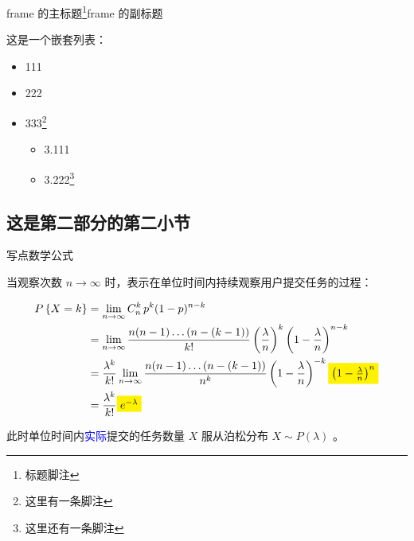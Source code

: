 \documentclass[aspectratio=169]{beamer}
\begin{document}
\begin{frame}{frame 的主标题\footnote{标题脚注}}{frame 的副标题}

    这是一个嵌套列表：

    \begin{itemize}
        \item 111
        \item 222
        \item 333\footnote{这里有一条脚注}
              \begin{itemize}
                  \item 3.111
                  \item 3.222\footnote{这里还有一条脚注}
              \end{itemize}
    \end{itemize}

\end{frame}

\subsection{这是第二部分的第二小节}

\begin{frame}{写点数学公式}

    当观察次数 $n \rightarrow \infty$ 时，表示在单位时间内持续观察用户提交任务的过程：

    \begin{equation*}
        \begin{split}
            P\left\{X=k\right\} & = \lim_{n \rightarrow \infty} C_n^k \, p^k (1-p)^{n-k}                                                                                                                              \\
            & = \lim_{n \rightarrow \infty} \frac{n(n-1)\dots(n-(k-1))}{k!} \left(\frac{\lambda}{n}\right)^k \left(1-\frac{\lambda}{n}\right)^{n-k}                                               \\
            & = \frac{\lambda^k}{k!} \lim_{n \rightarrow \infty} \frac{n(n-1)\dots(n-(k-1))}{n^k} \left(1-\frac{\lambda}{n}\right)^{-k} \colorbox{yellow}{$\left(1-\frac{\lambda}{n}\right)^{n}$} \\
            & = \frac{\lambda^k}{k!} \colorbox{yellow}{$e^{-\lambda}$}
        \end{split}
    \end{equation*}

    此时单位时间内\textcolor{blue}{实际}提交的任务数量 $X$ 服从泊松分布 $X \sim P(\lambda)$ 。

\end{frame}
\end{document}
